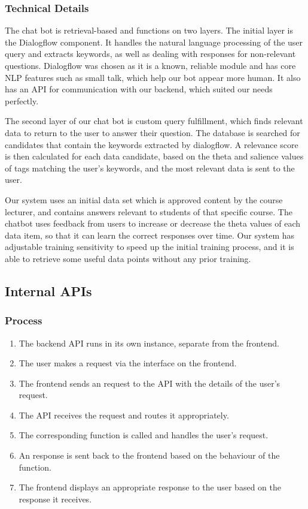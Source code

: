 \subsubsection{Technical Details}
The chat bot is retrieval-based and functions on two layers. The initial layer is the Dialogflow component. It handles the natural language processing of the user query and extracts keywords, as well as dealing with responses for non-relevant questions. Dialogflow was chosen as it is a known, reliable module and has core NLP features such as small talk, which help our bot appear more human. It also has an API for communication with our backend, which suited our needs perfectly.

The second layer of our chat bot is custom query fulfillment, which finds relevant data to return to the user to answer their question. The database is searched for candidates that contain the keywords extracted by dialogflow. A relevance score is then calculated for each data candidate, based on the theta and salience values of tags matching the user's keywords, and the most relevant data is sent to the user.

Our system uses an initial data set which is approved content by the course lecturer, and contains answers relevant to students of that specific course. The chatbot uses feedback from users to increase or decrease the theta values of each data item, so that it can learn the correct responses over time. Our system has adjustable training sensitivity to speed up the initial training process, and it is able to retrieve some useful data points without any prior training.

\subsection{Internal APIs}
\subsubsection{Process}
\begin{enumerate}
    \item{The backend API runs in its own instance, separate from the frontend.}
    \item{The user makes a request via the interface on the frontend.}
    \item{The frontend sends an  request to the API with the details of the user's request.}
    \item{The API receives the request and routes it appropriately.}
    \item{The corresponding function is called and handles the user's request.}
    \item{An  response is sent back to the frontend based on the behaviour of the function.}
    \item{The frontend displays an appropriate response to the user based on the response it receives.}
\end{enumerate}

